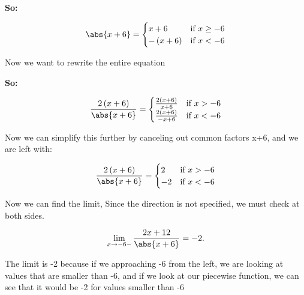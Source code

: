 \documentclass{report}
\begin{document}
        \bigbreak \noindent 
        \textbf{So:}

        \bigbreak \noindent 
           \begin{equation}
           \abs{x+6}=
                \begin{cases}
                    x+6 & \text{if } x \geq -6 \\ 
                    - \left(x+6\right) & \text{if } x < -6 
                \end{cases}
            \end{equation}

        \bigbreak \noindent 
        Now we want to rewrite the entire equation

        \bigbreak \noindent 
        \textbf{So:}

           \begin{equation}
               \frac{2 \left(x+6\right)}{\abs{x+6}}=
                \begin{cases}
                    \frac{2 \left(x+6\right)}{x+6} & \text{if } x > -6 \\ 
                    \frac{2 \left(x+6\right)}{-x+6} & \text{if } x < -6 
                \end{cases}
            \end{equation}

        \bigbreak \noindent 
        Now we can simplify this further by canceling out common factors x+6, and we are left with:

        \bigbreak \noindent 
           \begin{equation}
            \frac{2 \left(x+6\right)}{\abs{x+6}} =
                \begin{cases}
                     2 & \text{if } x > -6 \\
                     -2 & \text{if } x < -6 
                \end{cases}
            \end{equation}

        \bigbreak \noindent 
        Now we can find the limit, Since the direction is not specified, we must check at both sides.

        \bigbreak \noindent 
        \begin{align*}
            \lim\limits_{x \to -6- }{\frac{2x+12}{\abs{x+6}}} = -2
        .\end{align*}

        \bigbreak \noindent 
        The limit is -2 because if we approaching -6 from the left, we are looking
        at values that are smaller than -6, and if we look at our piecewise function, we can
        see that it would be -2 for values smaller than -6
\end{document}
